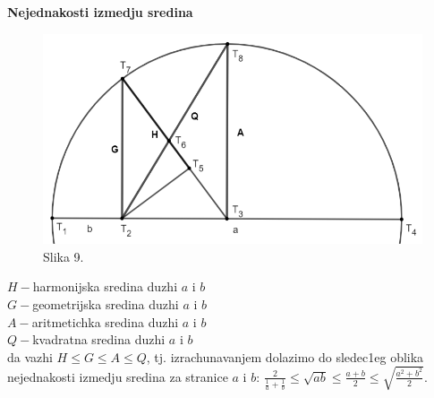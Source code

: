 \documentclass[11pt]{article}
\newcommand{\D}{\displaystyle}
\begin{document}
\newpage
\begin{center}
\LARGE
    \textbf{Nejednakosti izmedju sredina}
\end{center}
\par
\begin{figure} 
\centering
\includegraphics[scale=0.5]{Slike/NZM.PNG}
\caption*{Slika 9.}
\end{figure}
 
\begin{flushleft}
$H-$harmonijska sredina duzhi $a$ i $b$ \\
$G-$geometrijska sredina duzhi $a$ i $b$ \\
$A-$aritmetichka sredina duzhi $a$ i $b$ \\
$Q-$kvadratna sredina duzhi $a$ i $b$ \\
\vspace{0.5cm}
 da vazhi $H \leq G\leq A\leq Q$, tj. izrachunavanjem dolazimo do sledec1eg oblika nejednakosti izmedju sredina za stranice $a$ i $b$: $\D\frac{2}{\frac{1}{a}+\frac{1}{b}}\leq\sqrt{ab}\leq\frac{a+b}{2}\leq\sqrt{\frac{a^2+b^2}{2}}$.
\end{flushleft}
\end{document}
